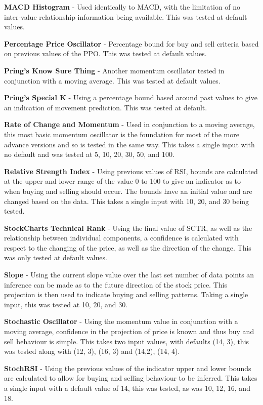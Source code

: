 \documentclass[conference]{IEEEtran}
\begin{document}
\textbf{MACD Histogram} - Used identically to MACD, with the limitation of no inter-value relationship information being available. This was tested at default values. 

\textbf{Percentage Price Oscillator} - Percentage bound for buy and sell criteria based on previous values of the PPO. This was tested at default values.

\textbf{Pring's Know Sure Thing} - Another momentum oscillator tested in conjunction with a moving average. This was tested at default values.

\textbf{Pring's Special K} - Using a percentage bound based around past values to give an indication of movement prediction. This was tested at default. 

\textbf{Rate of Change and Momentum} - Used in conjunction to a moving average, this most basic momentum oscillator is the foundation for most of the more advance versions and so is tested in the same way. This takes a single input with no default and was tested at 5, 10, 20, 30, 50, and 100.

\textbf{Relative Strength Index} - Using previous values of RSI, bounds are calculated at the upper and lower range of the value 0 to 100 to give an indicator as to when buying and selling should occur. The bounds have an initial value and are changed based on the data. This takes a single input with 10, 20, and 30 being tested.

\textbf{StockCharts Technical Rank} - Using the final value of SCTR, as well as the relationship between individual components, a confidence is calculated with respect to the changing of the price, as well as the direction of the change. This was only tested at default values.

\textbf{Slope} - Using the current slope value over the last set number of data points an inference can be made as to the future direction of the stock price. This projection is then used to indicate buying and selling patterns. Taking a single input, this was tested at 10, 20, and 30.

\textbf{Stochastic Oscillator} - Using the momentum value in conjunction with a moving average, confidence in the projection of price is known and thus buy and sell behaviour is simple. This takes two input values, with defaults (14, 3), this was tested along with (12, 3), (16, 3) and (14,2), (14, 4).

\textbf{StochRSI} - Using the previous values of the indicator upper and lower bounds are calculated to allow for buying and selling behaviour to be inferred. This takes a single input with a default value of 14, this was tested, as was 10, 12, 16, and 18.
\end{document}
